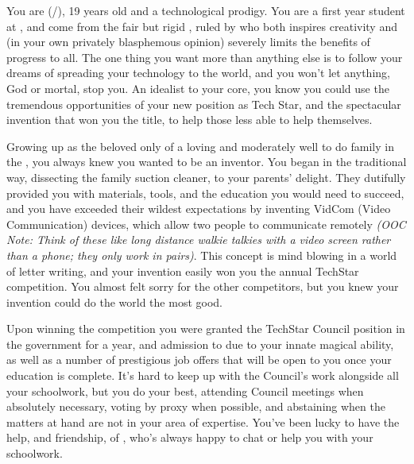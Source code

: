 \documentclass[char]{GL2020}
\begin{document}
\name{\cTechStar{}}

You are \cTechStar{\full} (\cTechStar{\they}/\cTechStar{\them}), 19 years old and a technological prodigy.  You are a first year student at \pSchool{}, and come from the fair but rigid \pTech{}, ruled by \cTechGod{} who both inspires creativity and (in your own privately blasphemous opinion) severely limits the benefits of progress to all. The one thing you want more than anything else is to follow your dreams of spreading your technology to the world, and you won't let anything, God or mortal, stop you.  An idealist to your core, you know you could use the tremendous opportunities of your new position as Tech Star, and the spectacular invention that won you the title, to help those less able to help themselves.

Growing up as the beloved only \cTechStar{\child} of a loving and moderately well to do family in the \pTech{}, you always knew you wanted to be an inventor.  You began in the traditional way, dissecting the family suction cleaner, to your parents' delight.  They dutifully provided you with materials, tools, and the education you would need to succeed, and you have exceeded their wildest expectations by inventing VidCom (Video Communication) devices, which allow two people to communicate remotely \emph{(OOC Note: Think of these like long distance walkie talkies with a video screen rather than a phone; they only work in pairs)}.  This concept is mind blowing in a world of letter writing, and your invention easily won you the annual TechStar competition. You almost felt sorry for the other competitors, but you knew your invention could do the world the most good.  

Upon winning the competition you were granted the TechStar Council position in the government for a year, and admission to \pSchool{} due to your innate magical ability, as well as a number of prestigious job offers that will be open to you once your education is complete. It's hard to keep up with the Council's work alongside all your schoolwork, but you do your best, attending Council meetings when absolutely necessary, voting by proxy when possible, and abstaining when the matters at hand are not in your area of expertise. You've been lucky to have the help, and friendship, of \cScholarship{\full}, who's always happy to chat or help you with your schoolwork.
\end{document}
